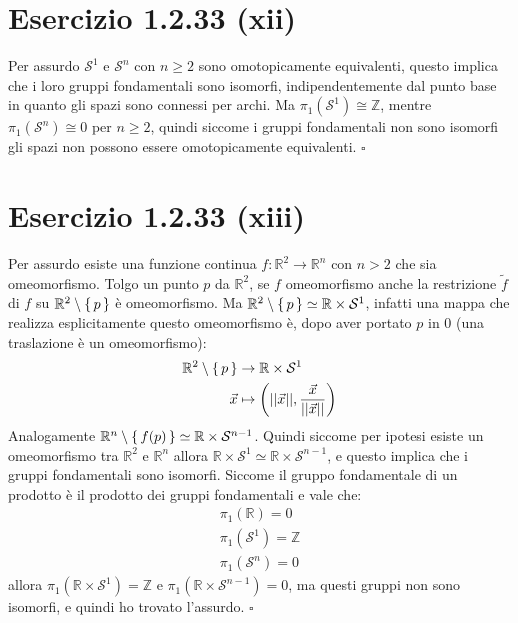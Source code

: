 \documentclass[10pt]{scrartcl}
\newcommand{\Z}{\mathbb{Z}}
\newcommand{\Sph}[1][]{\mathcal{S}^#1}
\begin{document}
\section{Esercizio 1.2.33 (xii)}
Per assurdo $ \Sph{1} $ e $ \Sph{n} $ con $ n \geq 2 $ sono omotopicamente
equivalenti, questo implica che i loro gruppi fondamentali sono isomorfi,
indipendentemente dal punto base in quanto gli spazi sono connessi per archi.
Ma $ \pi_1(\Sph{1}) \cong \Z $, mentre $ \pi_1(\Sph{n}) \cong 0 $ per $ n \geq 2 $, quindi
siccome i gruppi fondamentali non sono isomorfi gli spazi non possono
essere omotopicamente equivalenti.
\hfill $ \square $

\section{Esercizio 1.2.33 (xiii)}
Per assurdo esiste una funzione continua $ f \colon \mathbb{R}^2 \to \mathbb{R}^n $
con $ n > 2 $ che sia omeomorfismo. Tolgo un punto $ p $ da $ \mathbb{R}^2 $,
se $ f $ omeomorfismo anche la restrizione $ \tilde{f} $ di $ f $ su
$ \mathbb{R}^2 \setminus \set{p} $ è omeomorfismo.
Ma  $ \mathbb{R}^{2} \setminus  \set{p} \simeq \mathbb{R} \times \mathcal{S}^1 $, infatti una mappa
che realizza esplicitamente questo omeomorfismo è, dopo aver portato $ p $ in $ 0 $
(una traslazione è un omeomorfismo):
\begin{align*}
  \mathbb{R}^{2} \setminus \set{p} & \to \mathbb{R} \times \mathcal{S}^1 \\
  \vec{x} & \mapsto \left( || \vec{x} ||, \frac{\vec{x}}{|| \vec{x} ||} \right)
\end{align*}
Analogamente $ \mathbb{R}^{n} \setminus \set{f(p)}  \simeq \mathbb{R} \times \Sph{n-1} $.
Quindi siccome per ipotesi esiste un omeomorfismo tra $ \mathbb{R}^{2} $ e
$ \mathbb{R}^{n} $ allora $ \mathbb{R} \times \Sph{1} \simeq \mathbb{R} \times \Sph{n-1} $,
e questo implica che i gruppi fondamentali sono isomorfi.
Siccome il gruppo fondamentale di un prodotto è il prodotto dei gruppi fondamentali
e vale che:
\begin{gather*}
  \pi_1(\mathbb{R}) = 0 \\
  \pi_1(\Sph{1}) = \Z \\
  \pi_1(\Sph{n}) = 0
\end{gather*}
allora $ \pi_1 (\mathbb{R} \times \Sph{1}) = \Z $ e $ \pi_1(\mathbb{R} \times \Sph{n-1}) = 0 $, ma
questi gruppi non sono isomorfi, e quindi ho trovato l'assurdo.
\hfill $ \square $

\end{document}
